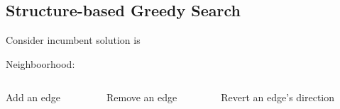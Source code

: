\subsection{Structure-based Greedy Search}
	\begin{frame}[fragile]
		Consider incumbent solution is
		\begin{figure}
			\centering
			
		\end{figure}
		Neighboorhood:
		\begin{columns}
			\begin{column}{.3\textwidth}
				\begin{figure}
					\centering
					
				\end{figure}
				\centering
				Add an edge
			\end{column}
			\begin{column}{.3\textwidth}
				\begin{figure}
					\centering
					
				\end{figure}
				\centering
				Remove an edge
			\end{column}
			\begin{column}{.3\textwidth}
				\begin{figure}
					\centering
					
				\end{figure}
				\centering
				Revert an edge's direction
			\end{column}
		\end{columns}
	\end{frame}
